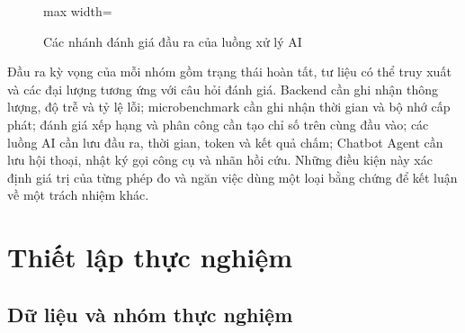 \begin{figure}[H]
  \centering
  \begin{adjustbox}{max width=\textwidth}
  \end{adjustbox}
  \caption{Các nhánh đánh giá đầu ra của luồng xử lý AI}
  \label{fig:ch4-ai-evaluation-flow}
\end{figure}

Đầu ra kỳ vọng của mỗi nhóm gồm trạng thái hoàn tất, tư liệu có thể truy xuất và các đại lượng tương ứng với câu hỏi đánh giá. Backend cần ghi nhận thông lượng, độ trễ và tỷ lệ lỗi; microbenchmark cần ghi nhận thời gian và bộ nhớ cấp phát; đánh giá xếp hạng và phân công cần tạo chỉ số trên cùng đầu vào; các luồng AI cần lưu đầu ra, thời gian, token và kết quả chấm; Chatbot Agent cần lưu hội thoại, nhật ký gọi công cụ và nhãn hồi cứu. Những điều kiện này xác định giá trị của từng phép đo và ngăn việc dùng một loại bằng chứng để kết luận về một trách nhiệm khác.

\section{Thiết lập thực nghiệm}

\subsection{Dữ liệu và nhóm thực nghiệm}

